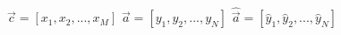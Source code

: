 \documentclass{article}
\begin{document}
$\vec c = [x_1, x_2,...,x_M]$
$\vec a = [y_1, y_2,...,y_N]$
$\hat{\vec a} = [\hat{y}_1, \hat{y}_2,...,\hat{y}_N]$
\end{document}
